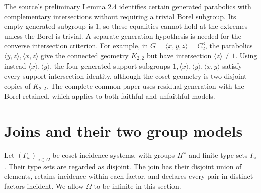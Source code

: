 The source's preliminary Lemma 2.4 identifies certain generated
parabolics with complementary intersections without requiring a trivial
Borel subgroup. Its empty generated subgroup is $1$, so these equalities
cannot hold at the extremes unless the Borel is trivial. A separate
generation hypothesis is needed for the converse intersection criterion.
For example, in $G=\langle x,y,z\rangle=C_2^3$, the parabolics
$\langle y,z\rangle,\langle x,z\rangle$ give the connected geometry
$K_{2,2}$ but have intersection $\langle z\rangle\ne1$. Using instead
$\langle x\rangle,\langle y\rangle$, the four generated-support
subgroups $1,\langle x\rangle,\langle y\rangle,\langle x,y\rangle$
satisfy every support-intersection identity, although the coset geometry
is two disjoint copies of $K_{2,2}$. The complete common paper uses
residual generation with the Borel retained, which applies to both faithful
and unfaithful models.

\section{Joins and their two group models}
Let $(\Gamma_\omega)_{\omega\in\Omega}$ be coset incidence systems,
with groups $H^\omega$ and finite type sets $I_\omega$. Their type sets
are regarded as disjoint. The join has their disjoint union of elements,
retains incidence within each factor, and declares every pair in distinct
factors incident. We allow $\Omega$ to be infinite in this section.

